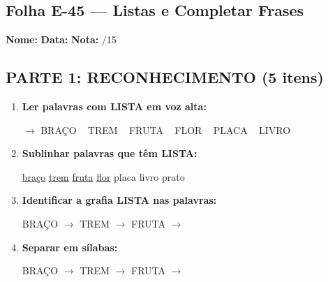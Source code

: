 \subsection{Folha E-45 --- Listas e Completar Frases}
\begin{exercicio}



\noindent\textbf{Nome:} \underline{\hspace{3.2cm}} \quad \textbf{Data:} \underline{\hspace{1.6cm}} \quad \textbf{Nota:} \underline{\hspace{0.9cm}}/15


\subsection*{PARTE 1: RECONHECIMENTO (5 itens)}

\begin{enumerate}

  \item \textbf{Ler palavras com LISTA em voz alta:}
  \begin{center}
  $\rightarrow$ BRAÇO ~ TREM ~ FRUTA ~ FLOR ~ PLACA ~ LIVRO
  \end{center}

  \item \textbf{Sublinhar palavras que têm LISTA:}

\begin{center}
  \uline{braço} \quad \uline{trem} \quad \uline{fruta} \quad \uline{flor} \quad placa \quad livro \quad prato
\end{center}

  \item \textbf{Identificar a grafia LISTA nas palavras:}
  \begin{center}
  BRAÇO $\rightarrow$ \underline{\hspace{1cm}} \quad TREM $\rightarrow$ \underline{\hspace{1cm}} \quad FRUTA $\rightarrow$ \underline{\hspace{1cm}}
  \end{center}

  \item \textbf{Separar em sílabas:}
  \begin{center}
  BRAÇO $\rightarrow$ \underline{\hspace{1.2cm}} \quad TREM $\rightarrow$ \underline{\hspace{1.2cm}} \quad FRUTA $\rightarrow$ \underline{\hspace{1.2cm}}
  \end{center}


\end{enumerate}
\end{exercicio}
